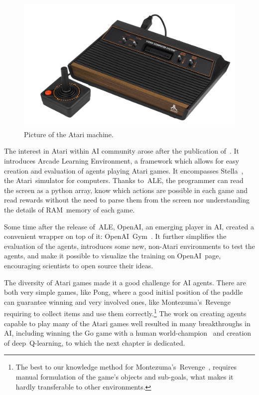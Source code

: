 \begin{figure}
  \centering
  \includegraphics[width=.8\linewidth]{images/atari.jpg}
  \caption{Picture of the Atari machine.}\label{atari-picture}
\end{figure}

The interest in Atari within AI community arose after the publication of~\cite{ale}. It introduces Arcade Learning Environment, a framework which allows for easy creation and evaluation of agents playing Atari games. It encompasses Stella~\cite{stella}, the Atari~simulator for computers. Thanks to~ALE, the programmer can read the screen as a python array, know which actions are possible in each game and read rewards without the need to parse them from the screen nor understanding the details of RAM~memory of each game.

Some time after the release of~ALE, OpenAI, an emerging player in AI, created a convenient wrapper on top of it: OpenAI~Gym~\cite{gym}. It further simplifies the evaluation of the agents, introduces some new, non-Atari environments to test the agents, and make it possible to visualize the training on OpenAI~page, encouraging scientists to open source their ideas.

The diversity of Atari games made it a good challenge for AI agents. There are both very simple games, like Pong, where a good initial position of the paddle can guarantee winning and very involved ones, like Montezuma's~Revenge requiring to collect items and use them correctly.\footnote{The best to our knowledge method for Montezuma's~Revenge~\cite{hdqn}, requires manual formulation of the game's objects and sub-goals, what makes it hardly transferable to other environments.} The work on creating agents capable to play many of the Atari games well resulted in many breakthroughs in AI, including winning the Go game with a human world-champion~\cite{alphago} and creation of deep~Q-learning, to which the next chapter is dedicated.

